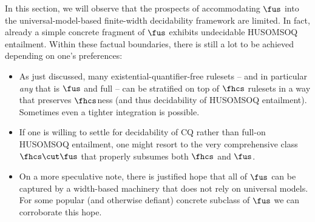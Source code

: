 In this section, we will observe that the prospects of accommodating $\fus$ into the universal-model-based finite-width decidability framework are limited. In fact, already a simple concrete fragment of $\fus$ exhibits undecidable HUSOMSOQ entailment. Within these factual boundaries, there is still a lot to be achieved depending on one's preferences:
\begin{itemize}
\item  
As just discussed, many existential-quantifier-free rulesets -- and in particular \emph{any} that is $\fus$ and full -- can be stratified on top of $\fhcs$ rulesets
in a way that preserves $\fhcs$ness (and thus decidability of HUSOMSOQ entailment). Sometimes even a tighter integration is possible.
\item  
If one is willing to settle for decidability of CQ rather than full-on HUSOMSOQ entailment, one might resort to the very comprehensive class $\fhcs\cut\fus$ that properly subsumes both $\fhcs$ and $\fus$.
\item
On a more speculative note, there is justified hope that all of $\fus$ can be captured by a width-based machinery that does not rely on universal models. For some popular (and otherwise defiant) concrete subclass of $\fus$ we can corroborate this hope. 
\end{itemize}

